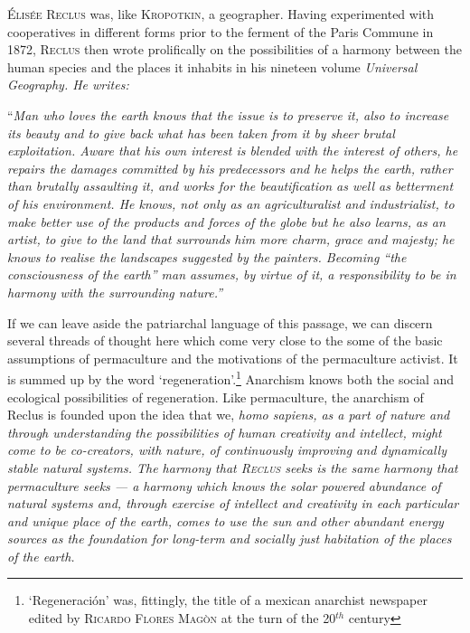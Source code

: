 \documentclass[a4paper, 11pt]{article}
\begin{document}
\begin{multicols*}{2}
\textsc{\'Elis\'ee Reclus} was, like \textsc{Kropotkin}, a geographer.  Having experimented with cooperatives in different forms prior to the ferment of the Paris Commune in 1872, \textsc{Reclus} then wrote prolifically on the possibilities of a harmony between the human species and the places it inhabits in his nineteen volume \em{Universal Geography}\em.  He writes:

\vspace{1mm}
``\em{Man who loves the earth knows that the issue is to preserve it, also to increase its beauty and to give back what has been taken from it by sheer brutal exploitation.  Aware that his own interest is blended with the interest of others, he repairs the damages committed by his predecessors and he helps the earth, rather than brutally assaulting it, and works for the beautification as well as betterment of his environment.  He knows, not only as an agriculturalist and industrialist, to make better use of the products and forces of the globe but he also learns, as an artist, to give to the land that surrounds him more charm, grace and majesty; he knows to realise \em{the landscapes suggested by the painters}\em.  Becoming ``the consciousness of the earth'' man assumes, by virtue of it, a responsibility to be in harmony with the surrounding nature.}\em''
\vspace{1mm}

If we can leave aside the patriarchal language of this passage, we can discern several threads of thought here which come very close to the some of the basic assumptions of permaculture and the motivations of the permaculture activist.  It is summed up by the word `regeneration'.\footnote{`Regeneraci\'on' was, fittingly, the title of a mexican anarchist newspaper edited by \textsc{Ricardo Flores Mag\`on} at the turn of the 20$^{th}$ century}  Anarchism knows both the social and ecological possibilities of regeneration. Like permaculture, the anarchism of Reclus is founded upon the idea that we, \em{homo sapiens}\em, as a part of nature and through understanding the possibilities of human creativity and intellect, might come to be co-creators, with nature, of continuously improving and dynamically stable natural systems.  The harmony that \textsc{Reclus} seeks is the same harmony that permaculture seeks --- a harmony which knows the solar powered abundance of natural systems and, through exercise of intellect and creativity in each particular and unique place of the earth, comes to use the sun and other abundant energy sources as the foundation for long-term and socially just habitation of the places of the earth.


\end{multicols*}
\end{document}
